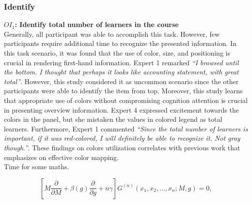 \subsubsection{Identify}
\textbf{$OI_1$: Identify total number of learners in the course} \\
Generally, all participant was able to accomplish this task. However, few participants require additional time to recognize the presented information. In this task scenario, it was found that the use of color, size, and positioning is crucial in rendering first-hand information. Expert 1 remarked \textit{“I browsed until the bottom. I thought that perhaps it looks like accounting statement, with great total”}. However, this study considered it as uncommon scenario since the other participants were able to identify the item from top. Moreover, this study learns that appropriate use of colors without compromising cognition attention is crucial in presenting overview information. Expert 4 expressed excitement towards the colors in the panel, but she mistaken the values in colored legend as total learners. Furthermore, Expert 1 commented \textit{“Since the total number of learners is important, if it was red-colored, I will definitely be able to recognize it. Not gray though.”}. These findings on colors utilization correlates with previous work that emphasizes on effective color mapping.
\\[\baselineskip]\indent
Time for some maths.

\begin{equation}
\left[M\frac{\partial }{\partial M}+\beta(g)\frac{\partial }{\partial g}+n\gamma\right] G^{(n)}(x_1,x_2,\ldots,x_n;M,g)=0,
\end{equation}

